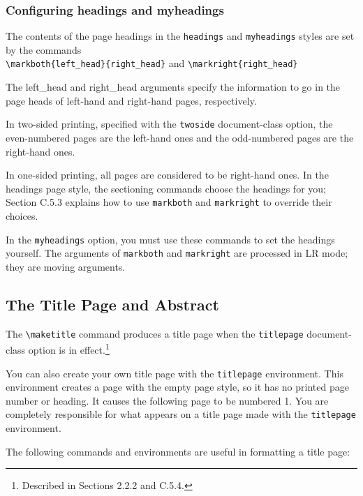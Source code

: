\documentclass{article}
\begin{document}
\subsubsection{Configuring headings and myheadings}

The contents of the page headings in the \verb:headings: and \verb:myheadings: styles are set by the 
commands \\
\verb:\markboth{left_head}{right_head}: and \verb:\markright{right_head}:

The left\_head and right\_head arguments specify the information to go in the page
heads of left-hand and right-hand pages, respectively. 

In two-sided printing, specified with the \texttt{twoside} document-class option, the even-numbered
pages are the left-hand ones and the odd-numbered pages are the right-hand ones.

In one-sided printing, all pages are considered to be right-hand ones. In the headings page style,
the sectioning commands choose the headings for you; Section C.5.3 explains how to use 
\verb:markboth: and \verb:markright: to override their choices.

In the \verb:myheadings: option, you must use these commands to set the headings yourself. The
arguments of \verb:markboth: and \verb:markright: are processed in LR mode; they are moving
arguments.

\subsection{The Title Page and Abstract}

The \verb:\maketitle: command produces a title page when the \texttt{titlepage} document-class
option is in effect.\footnote{Described in Sections 2.2.2 and C.5.4.}

You can also create your own title page with the \texttt{titlepage} environment. This environment
creates a page with the empty page style, so it has no printed page number or heading. It causes
the following page to be numbered 1. You are completely responsible for what appears on a title
page made with the \texttt{titlepage} environment. 

The following commands and environments are useful in formatting a title page: 
\end{document}
